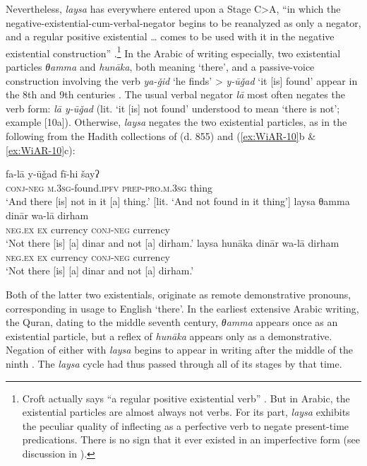 \documentclass[output=paper]{langsci/langscibook}
\begin{document}
Nevertheless, \textit{laysa} has everywhere entered upon a Stage C>A, “in which the negative-existential-cum-verbal-negator begins to be reanalyzed as only a negator, and a regular positive existential … comes to be used with it in the negative existential construction” \citep[12]{Croft1991}.\footnote{Croft actually says “a regular positive existential verb” \citep[12]{Croft1991}. But in Arabic, the existential particles are almost always not verbs. For its part, \textit{laysa} exhibits the peculiar quality of inflecting as a perfective verb to negate present-time predications. There is no sign that it ever existed in an imperfective form (see discussion in \citet[341-346]{wilmsen2016a}).} In the Arabic of writing especially, two existential particles \textit{θamma} and \textit{hunāka}, both meaning ‘there’, and a passive-voice construction involving the verb \textit{ya-ǧid} ‘he finds’ > \textit{y-ūǧad} ‘it [is] found’ appear in the 8th and 9th centuries \citep[354–356]{wilmsen2016a}. The usual verbal negator \textit{lā} most often negates the verb form: \textit{lā y-ūǧad} (lit. ‘it [is] not found’ understood to mean ‘there is not’; example [10a]). Otherwise, \textit{laysa} negates the two existential particles, as in the following from the Hadith collections of \citeauthor{anbal-a} (d. 855) and \citeauthor{al-bu2000a} (\ref{ex:WiAR-10}b \& \ref{ex:WiAR-10}c): 

\ea \label{ex:WiAR-10}
  \ea
  	\gll fa-lā y-ūǧad fī-hi šayʔ\\
  	\textsc{conj-neg} \textsc{m.3sg}-found.\textsc{ipfv}	\textsc{prep-pro.m.3sg} thing\\
  	\glt ‘And there [is] not in it [a] thing.’ [lit. ‘And not found in it thing’] \citep[Vol. VIII p. 1256]{al-bu2000a}
  \ex
  	\gll laysa θamma dinār wa-lā dirham \\
  	\textsc{neg.ex} \textsc{ex} currency \textsc{conj-neg} currency \\
    \glt ‘Not there [is] [a] dinar and not [a] dirham.' \citep[Vol. VIII p. 1323]{al-bu2000a}
  \ex
  	\gll laysa hunāka dinār wa-lā dirham \\
  	\textsc{neg.ex} \textsc{ex} currency \textsc{conj-neg} currency\\
  	\glt ‘Not there [is] [a] dinar and not [a] dirham.’ \citep[Vol. IX, p. 507]{anbal-a}
\z \z

Both of the latter two existentials, originate as remote demonstrative pronouns, corresponding in usage to English ‘there’. In the earliest extensive Arabic writing, the Quran, dating to the middle seventh century, \textit{θamma} appears once as an existential particle, but a reflex of \textit{hunāka} appears only as a demonstrative. Negation of either with \textit{laysa} begins to appear in writing after the middle of the ninth \citep[354-355]{wilmsen2016a}. The \textit{laysa} cycle had thus passed through all of its stages by that time. 
\end{document}
